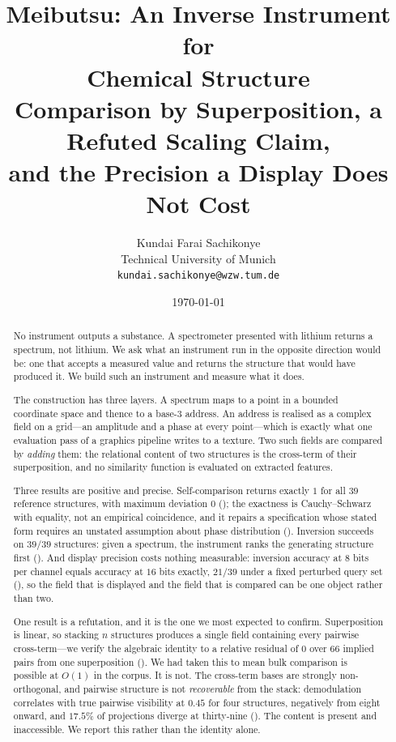 \documentclass[11pt,twocolumn,a4paper]{article}
\title{\textbf{Meibutsu: An Inverse Instrument for\\Chemical
Structure}\\[6pt]
\large Comparison by Superposition, a Refuted Scaling Claim,\\
and the Precision a Display Does Not Cost}
\author{%
Kundai Farai Sachikonye\\
\small Technical University of Munich\\
\small \texttt{kundai.sachikonye@wzw.tum.de}}
\date{\today}
\theoremstyle{upthm}
\theoremstyle{definition}
\theoremstyle{remark}
\begin{document}
\maketitle

\begin{abstract}
\noindent
No instrument outputs a substance. A spectrometer presented with lithium
returns a spectrum, not lithium. We ask what an instrument run in the
opposite direction would be: one that accepts a measured value and
returns the structure that would have produced it. We build such an
instrument and measure what it does.

The construction has three layers. A spectrum maps to a point in a
bounded coordinate space and thence to a base-3 address. An address is
realised as a complex field on a grid---an amplitude and a phase at every
point---which is exactly what one evaluation pass of a graphics pipeline
writes to a texture. Two such fields are compared by \emph{adding} them:
the relational content of two structures is the cross-term of their
superposition, and no similarity function is evaluated on extracted
features.

Three results are positive and precise. Self-comparison returns exactly
$1$ for all $39$ reference structures, with maximum deviation $0$
(); the exactness is Cauchy--Schwarz with equality, not
an empirical coincidence, and it repairs a specification whose stated
form requires an unstated assumption about phase distribution
(). Inversion succeeds on $39/39$ structures: given
a spectrum, the instrument ranks the generating structure first
(). And display precision costs nothing measurable:
inversion accuracy at $8$ bits per channel equals accuracy at $16$ bits
exactly, $21/39$ under a fixed perturbed query set
(), so the field that is displayed and the field that
is compared can be one object rather than two.

One result is a refutation, and it is the one we most expected to
confirm. Superposition is linear, so stacking $n$ structures produces a
single field containing every pairwise cross-term---we verify the
algebraic identity to a relative residual of $0$ over $66$ implied pairs
from one superposition (). We had taken this to mean
bulk comparison is possible at $O(1)$ in the corpus. It is not. The
cross-term bases are strongly non-orthogonal, and pairwise structure is
not \emph{recoverable} from the stack: demodulation correlates with true
pairwise visibility at $0.45$ for four structures, negatively from eight
onward, and $17.5\%$ of projections diverge at thirty-nine
(). The content is present and inaccessible. We
report this rather than the identity alone.


\end{abstract}
\end{document}
